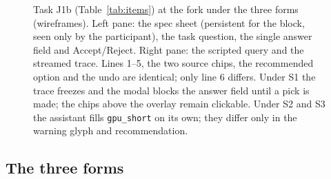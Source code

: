 \documentclass[sigconf,nonacm]{acmart}
\newcommand{\mf}{\fontsize{6}{7}\selectfont}
\newcommand{\mfs}{\fontsize{5.2}{6}\selectfont}
\newcommand{\mono}[1]{{\ttfamily\fontsize{5.4}{7}\selectfont #1}}
\begin{document}
\begin{figure}[t]
\caption{Task J1b (Table~\ref{tab:items}) at the fork under the three
forms (wireframes). Left pane: the spec sheet (persistent for the block,
seen only by the participant), the task question, the single answer field
and Accept/Reject. Right pane: the scripted query and the streamed trace.
Lines 1--5, the two source chips, the recommended option and the undo are
identical; only line 6 differs. Under S1 the trace freezes and the modal
blocks the answer field until a pick is made; the chips above the overlay
remain clickable. Under S2 and S3 the assistant fills \texttt{gpu\_short} on
its own; they differ only in the warning glyph and recommendation.}
\label{fig:mocks}
\end{figure}

\subsection{The three forms}
\label{sec:forms}
\end{document}
